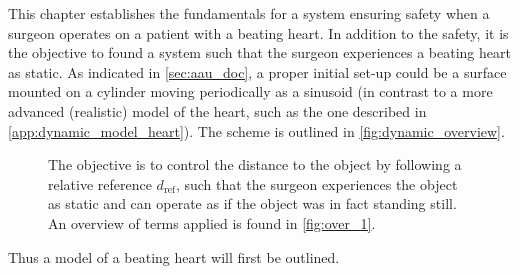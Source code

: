 This chapter establishes the fundamentals for a system ensuring safety when a surgeon operates on a patient with a beating heart. In addition to the safety, it is the objective to found a system such that the surgeon experiences a beating heart as static. As indicated in \autoref{sec:aau_doc}, a proper initial set-up could be a surface mounted on a cylinder moving periodically as a sinusoid (in contrast to a more advanced (realistic) model of the heart, such as the one described in \autoref{app:dynamic_model_heart}). The scheme is outlined in \autoref{fig:dynamic_overview}.
\vspace{-2mm}
\begin{figure}[H]
 \hspace{0.5cm}
%
\caption{The objective is to control the distance to the object by following a relative reference $d_\text{ref}$, such that the surgeon experiences the object as static and can operate as if the object was in fact standing still. An overview of terms applied is found in \autoref{fig:over_1}.}
\label{fig:dynamic_overview}
\end{figure}
Thus a model of a beating heart will first be outlined.
